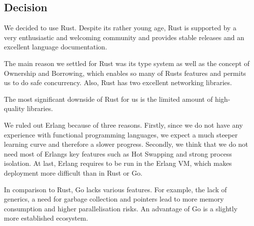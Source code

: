 \subsection{Decision}
We decided to use Rust. Despite its rather young age, Rust is supported by a very enthusiastic and welcoming community and provides stable releases and an excellent language documentation.

The main reason we settled for Rust was its type system as well as the concept of Ownership and Borrowing, which enables so many of Rusts features and permits us to do safe concurrency. Also, Rust has two excellent networking libraries.

The most significant downside of Rust for us is the limited amount of high-quality libraries.

We ruled out Erlang because of three reasons. Firstly, since we do not have any experience with functional programming languages, we expect a much steeper learning curve and therefore a slower progress. Secondly, we think that we do not need most of Erlangs key features such as Hot Swapping and strong process isolation. At last, Erlang requires to be run in the Erlang VM, which makes deployment more difficult than in Rust or Go.

In comparison to Rust, Go lacks various features. For example, the lack of generics, a need for garbage collection and pointers lead to more memory consumption and higher parallelisation risks. An advantage of Go is a slightly more established ecosystem.